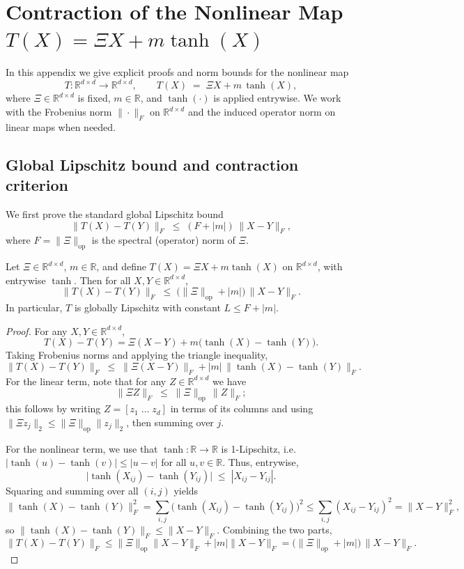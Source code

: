 \documentclass[11pt]{article}
\begin{document}
\renewcommand{\thesection}{A}
\setcounter{section}{0}

\section{Contraction of the Nonlinear Map $T(X)=\Xi X + m\tanh(X)$}

In this appendix we give explicit proofs and norm bounds for the nonlinear map
\[
  T:\mathbb{R}^{d\times d}\to\mathbb{R}^{d\times d},\qquad
  T(X) \;=\; \Xi X + m\,\tanh(X),
\]
where $\Xi\in\mathbb{R}^{d\times d}$ is fixed, $m\in\mathbb{R}$, and $\tanh(\cdot)$ is applied entrywise. We work with the Frobenius norm $\|\cdot\|_F$ on $\mathbb{R}^{d\times d}$ and the induced operator norm on linear maps when needed.

\subsection{Global Lipschitz bound and contraction criterion}

We first prove the standard global Lipschitz bound
\[
  \|T(X)-T(Y)\|_F \;\leq\; (F + |m|)\,\|X-Y\|_F,
\]
where $F = \|\Xi\|_{\mathrm{op}}$ is the spectral (operator) norm of $\Xi$.

\begin{proposition}
Let $\Xi\in\mathbb{R}^{d\times d}$, $m\in\mathbb{R}$, and define $T(X)=\Xi X + m\tanh(X)$ on $\mathbb{R}^{d\times d}$, with entrywise $\tanh$. Then for all $X,Y\in\mathbb{R}^{d\times d}$,
\[
  \|T(X)-T(Y)\|_F \;\leq\; \bigl(\|\Xi\|_{\mathrm{op}} + |m|\bigr)\,\|X-Y\|_F.
\]
In particular, $T$ is globally Lipschitz with constant $L\le F+|m|$.
\end{proposition}

\begin{proof}
For any $X,Y\in\mathbb{R}^{d\times d}$,
\[
  T(X)-T(Y) 
  = \Xi(X-Y) + m\bigl(\tanh(X)-\tanh(Y)\bigr).
\]
Taking Frobenius norms and applying the triangle inequality,
\[
  \|T(X)-T(Y)\|_F \;\leq\; \|\Xi(X-Y)\|_F + |m|\,\|\tanh(X)-\tanh(Y)\|_F.
\]
For the linear term, note that for any $Z\in\mathbb{R}^{d\times d}$ we have
\[
  \|\Xi Z\|_F \;\leq\; \|\Xi\|_{\mathrm{op}}\,\|Z\|_F;
\]
this follows by writing $Z=[z_1\;\dots\;z_d]$ in terms of its columns and using
$\|\Xi z_j\|_2\le\|\Xi\|_{\mathrm{op}}\|z_j\|_2$, then summing over $j$.

For the nonlinear term, we use that $\tanh:\mathbb{R}\to\mathbb{R}$ is 1-Lipschitz, i.e. $|\tanh(u)-\tanh(v)|\le|u-v|$ for all $u,v\in\mathbb{R}$. Thus, entrywise,
\[
  \bigl|\tanh(X_{ij})-\tanh(Y_{ij})\bigr| \;\leq\; |X_{ij}-Y_{ij}|.
\]
Squaring and summing over all $(i,j)$ yields
\[
  \|\tanh(X)-\tanh(Y)\|_F^2 
  = \sum_{i,j}\bigl(\tanh(X_{ij})-\tanh(Y_{ij})\bigr)^2
  \le \sum_{i,j}(X_{ij}-Y_{ij})^2
  = \|X-Y\|_F^2,
\]
so $\|\tanh(X)-\tanh(Y)\|_F\le\|X-Y\|_F$. Combining the two parts,
\[
  \|T(X)-T(Y)\|_F
  \le \|\Xi\|_{\mathrm{op}}\|X-Y\|_F + |m|\|X-Y\|_F
  = \bigl(\|\Xi\|_{\mathrm{op}}+|m|\bigr)\,\|X-Y\|_F.
\]
\end{proof}
\end{document}
